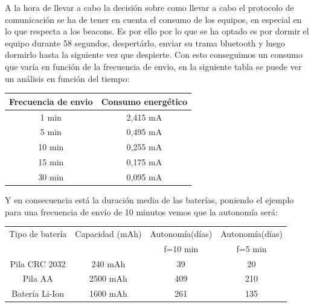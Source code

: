 \documentclass[a4paper ,12pt, onecolumn]{article}
\begin{document}
            A la hora de llevar a cabo la decisión sobre como llevar a cabo el protocolo de comunicación se ha de tener en cuenta 
            el consumo de los equipos, en especial en lo que respecta a los beacons.
            Es por ello por lo que se ha optado es por dormir el equipo durante 58 segundos, despertárlo,
            enviar su trama bluetooth y luego dormirlo hasta la siguiente vez que despierte.
            Con esto conseguimos un consumo que varía en función de la frecuencia de envio, en la siguiente tabla
            se puede ver un análisis en función del tiempo:
            \begin{center}
                \begin{tabular}{||c || c ||} 
                \hline
                Frecuencia de envio  & Consumo energético  \\ [0.5ex] 
                \hline
                1 min &  2,415 mA \\
                5 min &  0,495 mA \\ 
                10 min &  0,255 mA \\ 
                15 min &  0,175 mA \\ 
                30 min &  0,095 mA \\ 
                \hline
                \end{tabular}
            \end{center}
            Y en consecuencia está la duración media de las baterías, poniendo el ejemplo para una frecuencia de 
            envío de 10 minutos vemos que la autonomía será:
            \begin{center}
                \begin{tabular}{|c | c| c| c |} 
                \hline
                    Tipo de batería & Capacidad (mAh) & Autonomía(días) & Autonomía(días)   \\ [0.5ex] 
                    &  &  f=10 min &  f=5 min   \\ [0.5ex] 
                \hline
                \hline
                    Pila CRC 2032 &  240 mAh  & 39   & 20 \\ 
                    Pila AA       &  2500 mAh & 409  & 210 \\ 
                    Batería Li-Ion&  1600 mAh & 261  & 135 \\ 
                \hline
                \end{tabular}
            \end{center}
\end{document}

